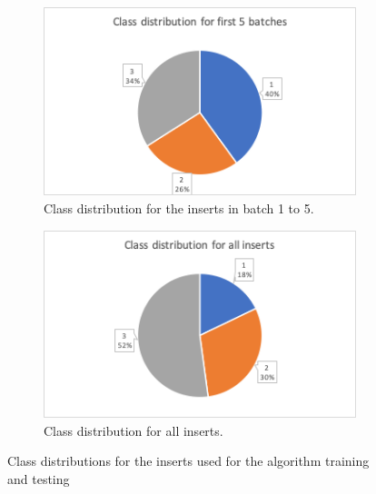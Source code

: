 \begin{figure}[hbtp]
	\centering
	\begin{subfigure}{0.49\textwidth}
		\includegraphics[width=\linewidth]{fig/Vision/GoogleColab/labels/class_distr_1-5.png}
		\caption{Class distribution for the inserts in batch 1 to 5.}
		\label{fig:impl:va:classdistr:1-5}
	\end{subfigure}
	\hspace*{\fill}
	\begin{subfigure}{0.49\textwidth}
		\includegraphics[width=\linewidth]{fig/Vision/GoogleColab/labels/class_distr_all.png}
		\caption{Class distribution for all inserts.}
		\label{fig:impl:va:classdistr:all}
	\end{subfigure}
	\caption{Class distributions for the inserts used for the algorithm training and testing}
	\label{fig:impl:va:do:classdistr}
\end{figure}

